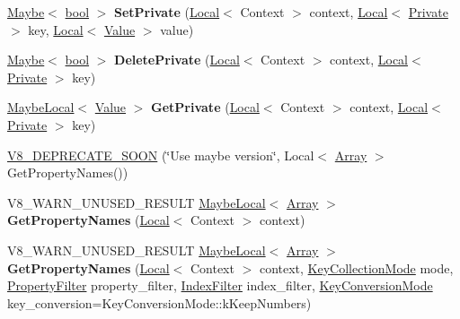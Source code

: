 \begin{DoxyCompactItemize}
\item 
\mbox{\label{classv8_1_1Object_a218d4c58fe168396ce4318b06dbfe8ba}} 
\mbox{\hyperlink{classv8_1_1Maybe}{Maybe}}$<$ \mbox{\hyperlink{classbool}{bool}} $>$ {\bfseries Set\+Private} (\mbox{\hyperlink{classv8_1_1Local}{Local}}$<$ Context $>$ context, \mbox{\hyperlink{classv8_1_1Local}{Local}}$<$ \mbox{\hyperlink{classv8_1_1Private}{Private}} $>$ key, \mbox{\hyperlink{classv8_1_1Local}{Local}}$<$ \mbox{\hyperlink{classv8_1_1Value}{Value}} $>$ value)
\item 
\mbox{\label{classv8_1_1Object_adb291790c0a77aa8767607b8aa4b1e92}} 
\mbox{\hyperlink{classv8_1_1Maybe}{Maybe}}$<$ \mbox{\hyperlink{classbool}{bool}} $>$ {\bfseries Delete\+Private} (\mbox{\hyperlink{classv8_1_1Local}{Local}}$<$ Context $>$ context, \mbox{\hyperlink{classv8_1_1Local}{Local}}$<$ \mbox{\hyperlink{classv8_1_1Private}{Private}} $>$ key)
\item 
\mbox{\label{classv8_1_1Object_a6fe2f08371d5083a4f3572c399ae2b2a}} 
\mbox{\hyperlink{classv8_1_1MaybeLocal}{Maybe\+Local}}$<$ \mbox{\hyperlink{classv8_1_1Value}{Value}} $>$ {\bfseries Get\+Private} (\mbox{\hyperlink{classv8_1_1Local}{Local}}$<$ Context $>$ context, \mbox{\hyperlink{classv8_1_1Local}{Local}}$<$ \mbox{\hyperlink{classv8_1_1Private}{Private}} $>$ key)
\item 
\mbox{\hyperlink{classv8_1_1Object_a3f735ad2eab826ddc5eba467ce624acb}{V8\+\_\+\+D\+E\+P\+R\+E\+C\+A\+T\+E\+\_\+\+S\+O\+ON}} (\char`\"{}Use maybe version\char`\"{}, Local$<$ \mbox{\hyperlink{classv8_1_1Array}{Array}} $>$ Get\+Property\+Names())
\item 
\mbox{\label{classv8_1_1Object_a25f9b5cf555060535ca91da20bb8e1e3}} 
V8\+\_\+\+W\+A\+R\+N\+\_\+\+U\+N\+U\+S\+E\+D\+\_\+\+R\+E\+S\+U\+LT \mbox{\hyperlink{classv8_1_1MaybeLocal}{Maybe\+Local}}$<$ \mbox{\hyperlink{classv8_1_1Array}{Array}} $>$ {\bfseries Get\+Property\+Names} (\mbox{\hyperlink{classv8_1_1Local}{Local}}$<$ Context $>$ context)
\item 
\mbox{\label{classv8_1_1Object_aa1b8d22ee7335812d74aa27cfbbbf5a0}} 
V8\+\_\+\+W\+A\+R\+N\+\_\+\+U\+N\+U\+S\+E\+D\+\_\+\+R\+E\+S\+U\+LT \mbox{\hyperlink{classv8_1_1MaybeLocal}{Maybe\+Local}}$<$ \mbox{\hyperlink{classv8_1_1Array}{Array}} $>$ {\bfseries Get\+Property\+Names} (\mbox{\hyperlink{classv8_1_1Local}{Local}}$<$ Context $>$ context, \mbox{\hyperlink{namespacev8_a0cee20f5c7f0d59d0835af8e537388dc}{Key\+Collection\+Mode}} mode, \mbox{\hyperlink{namespacev8_afbf02b6b1152a3e25d7bde90798209ac}{Property\+Filter}} property\+\_\+filter, \mbox{\hyperlink{namespacev8_a46fd71fef702b35b34ed7495e7a63323}{Index\+Filter}} index\+\_\+filter, \mbox{\hyperlink{namespacev8_aa65aeff871614520d8033dead4b34e38}{Key\+Conversion\+Mode}} key\+\_\+conversion=Key\+Conversion\+Mode\+::k\+Keep\+Numbers)

\end{DoxyCompactItemize}
